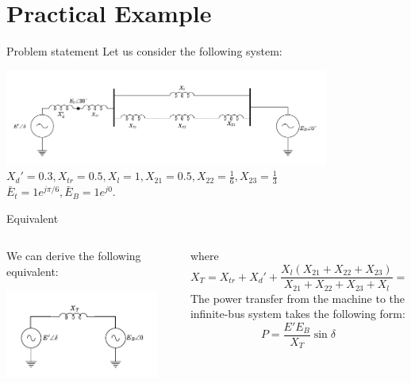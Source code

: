\section{Practical Example}
\begin{frame}{Problem statement}
Let us consider the following system:
\begin{center}
\includegraphics[width=0.8\textwidth]{images/InitialSystem.png}
$X_d' = 0.3, X_{tr} = 0.5, X_{l} = 1, X_{21} = 0.5, X_{22} = \frac{1}{6}, X_{23} = \frac{1}{3}$\\
$\bar{E}_{t} = 1e^{j \pi/6}, \bar{E}_{B} = 1e^{j0}$.
\end{center}
\end{frame}

\begin{frame}{Equivalent}
    \begin{columns}
    \begin{column}{0.5\textwidth}
        We can derive the following equivalent:
        \begin{center}
        \includegraphics[width=0.9\textwidth]{images/InitialSystemEq.pdf}
        \end{center}
    \end{column}
    \begin{column}{0.5\textwidth}
        where $$X_T = X_{tr} + X_{d}' + \frac{X_{l}\left(X_{21}+X_{22}+X_{23}\right)}{X_{21}+X_{22}+X_{23}+X_{l}} = 1.3 pu.$$
        The power transfer from the machine to the infinite-bus system takes the following form:
        $$P = \frac{E' E_{B}}{X_{T}} \sin \delta$$
    \end{column}
\end{columns}



\end{frame}

